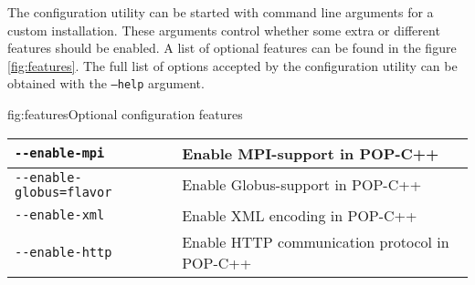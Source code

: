 The configuration utility can be started with command line arguments
for a custom installation. These arguments control whether some extra or
different features should be enabled. A list of optional features can be
found in the figure \ref{fig:features}. The full list of options
accepted by the configuration utility can be obtained with the
\texttt{---help} argument.

\begin{figura}{fig:features}{Optional configuration features}
\begin{tabular}{| l | l |}
\hline
\tt -\--enable-mpi  	& Enable MPI-support in POP-C++\\ \hline
\tt -\--enable-globus=flavor  	& Enable Globus-support in POP-C++\\ \hline
\tt -\--enable-xml  			& Enable XML encoding in POP-C++\\ \hline
\tt -\--enable-http  			& Enable HTTP communication protocol in POP-C++\\ \hline
\end{tabular}
\end{figura}


